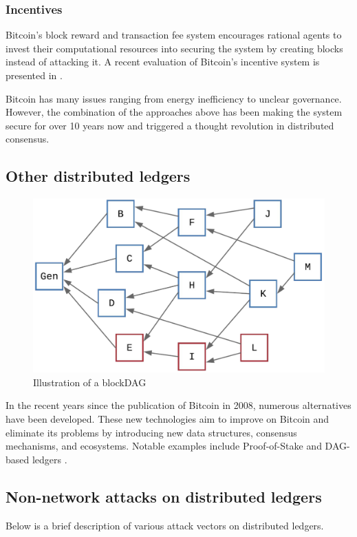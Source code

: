 \documentclass[12pt]{article}
\begin{document}
\subsubsection{Incentives}

    Bitcoin's block reward and transaction fee system encourages rational agents to invest their computational resources into securing the system by creating blocks instead of attacking it. A recent evaluation of Bitcoin's incentive system is presented in \cite{Incentives}.

Bitcoin has many issues ranging from energy inefficiency to unclear governance. However, the combination of the approaches above has been making the system secure for over 10 years now and triggered a thought revolution in distributed consensus.

\subsection{Other distributed ledgers}

\begin{figure}[h!]
\centering
\includegraphics[width=0.6\columnwidth]{images/dag-ledger.png}
\caption{Illustration of a blockDAG \cite{GHOSTDAG}}
\label{fig:dag}
\end{figure}

In the recent years since the publication of Bitcoin in 2008, numerous alternatives have been developed. These new technologies aim to improve on Bitcoin and eliminate its problems by introducing new data structures, consensus mechanisms, and ecosystems. Notable examples include Proof-of-Stake \cite{PoS, PoS2} and DAG-based ledgers \cite{Inclusive, SPECTRE, GHOSTDAG, Conflux, Tangle, Avalanche}.


\subsection{Non-network attacks on distributed ledgers}

Below is a brief description of various attack vectors on distributed ledgers.
\end{document}
